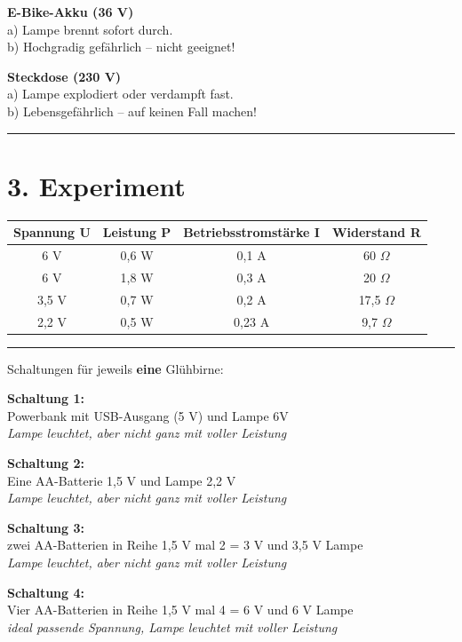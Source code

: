 \documentclass[a4paper,12pt]{article}
\begin{document}
	\textbf{E-Bike-Akku (36 V)}   \\
	a) Lampe brennt sofort durch.   \\
	b) Hochgradig gefährlich – nicht geeignet!
	
	\textbf{Steckdose (230 V)}   \\
	a) Lampe explodiert oder verdampft fast.   \\
	b) Lebensgefährlich – auf keinen Fall machen!
	
	\hrule
	
	\section*{3. Experiment}
	
		\renewcommand{\arraystretch}{2}
	\begin{tabular}{|c|c|c|c|}
		\hline
		Spannung  U & Leistung P & Betriebsstromstärke I & Widerstand R \\ 
		\hline
		6 V  &  0,6 W & 0,1 A& 60 $\Omega$\\
		\hline
		6 V  & 1,8 W & 0,3 A & 20 $\Omega$\\
		\hline
		3,5 V & 0,7 W & 0,2 A  & 17,5  $\Omega$\\
		\hline
		2,2 V &  0,5 W &0,23 A & 9,7 $\Omega$ \\
		\hline
	\end{tabular}
	\hrule
	

	\newpage
	
	Schaltungen für jeweils 	\textbf{eine} Glühbirne:
	
	\textbf{Schaltung 1:}   \\
	Powerbank mit USB-Ausgang (5 V) und Lampe 6V \\
	\textit{Lampe leuchtet, aber  nicht ganz mit voller Leistung}
	
	\textbf{Schaltung 2:}   \\
	Eine AA-Batterie 1,5 V und Lampe 2,2 V\\
	\textit{Lampe leuchtet, aber nicht ganz mit voller Leistung}
	
	
	\textbf{Schaltung 3:}   \\
	zwei AA-Batterien in Reihe 1,5 V mal 2 = 3 V und 3,5 V Lampe\\
	\textit{ Lampe leuchtet, aber nicht ganz mit voller Leistung}
	
	\textbf{Schaltung 4:}   \\
	Vier AA-Batterien in Reihe 1,5 V mal 4 = 6 V und 6 V Lampe\\
	\textit{ ideal passende Spannung, Lampe leuchtet mit voller Leistung}
	
\end{document}
